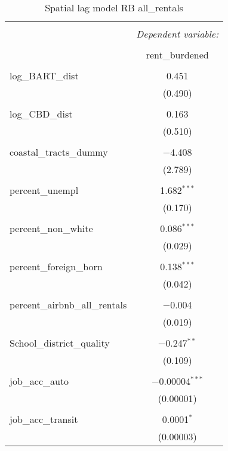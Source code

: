 \documentclass[10pt, letterpaper]{amsart}
\begin{document}
\begin{table}[H] \centering 
  \caption{Spatial lag model RB all\_rentals} 
  \label{} 
  \begin{tabular}{@{\extracolsep{5pt}}lc} 
    \\[-1.8ex]\hline 
    \hline \\[-1.8ex] 
    & \multicolumn{1}{c}{\textit{Dependent variable:}} \\ 
    \cline{2-2} 
    \\[-1.8ex] & rent\_burdened \\ 
    \hline \\[-1.8ex] 
    log\_BART\_dist & 0.451 \\ 
    & (0.490) \\ 
    & \\ 
    log\_CBD\_dist & 0.163 \\ 
    & (0.510) \\ 
    & \\ 
    coastal\_tracts\_dummy & $-$4.408 \\ 
    & (2.789) \\ 
    & \\ 
    percent\_unempl & 1.682$^{***}$ \\ 
    & (0.170) \\ 
    & \\ 
    percent\_non\_white & 0.086$^{***}$ \\ 
    & (0.029) \\ 
    & \\ 
    percent\_foreign\_born & 0.138$^{***}$ \\ 
    & (0.042) \\ 
    & \\ 
    percent\_airbnb\_all\_rentals & $-$0.004 \\ 
    & (0.019) \\ 
    & \\ 
    School\_district\_quality & $-$0.247$^{**}$ \\ 
    & (0.109) \\ 
    & \\ 
    job\_acc\_auto & $-$0.00004$^{***}$ \\ 
    & (0.00001) \\ 
    & \\ 
    job\_acc\_transit & 0.0001$^{*}$ \\ 
    & (0.00003) \\ 

\end{tabular}
\end{table}
\end{document}
